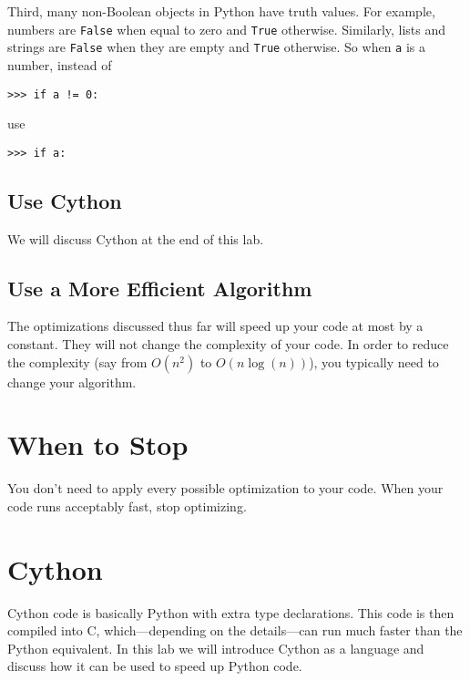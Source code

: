 Third, many non-Boolean objects in Python have truth values.
For example, numbers are \texttt{False} when equal to zero and \texttt{True} otherwise.
Similarly, lists and strings are \texttt{False} when they are empty and \texttt{True} otherwise.
So when \texttt{a} is a number, instead of
\begin{lstlisting}
>>> if a != 0:
\end{lstlisting}
use
\begin{lstlisting}
>>> if a:
\end{lstlisting}
\subsection*{Use Cython}
We will discuss Cython at the end of this lab.

\subsection*{Use a More Efficient Algorithm}
The optimizations discussed thus far will speed up your code at most by a constant.
They will not change the complexity of your code.
In order to reduce the complexity (say from $O(n^2)$ to $O(n \log(n))$), you typically need to change your algorithm.









\section*{When to Stop}
You don't need to apply every possible optimization to your code.
When your code runs acceptably fast, stop optimizing.



\section*{Cython}
Cython code is basically Python with extra type declarations.
This code is then compiled into C, which---depending on the details---can run much faster than the Python equivalent.
In this lab we will introduce Cython as a language and discuss how it can be used to speed up Python code.

